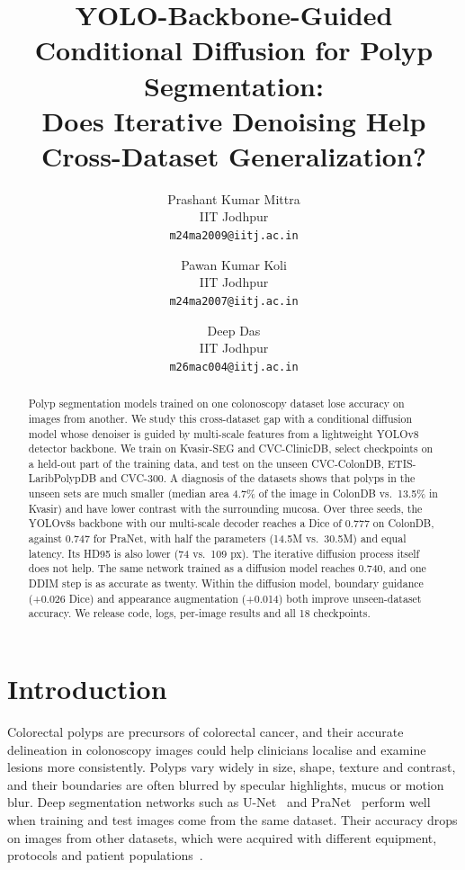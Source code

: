 \documentclass[10pt,twocolumn,letterpaper]{article}
\title{YOLO-Backbone-Guided Conditional Diffusion for Polyp Segmentation:\\
Does Iterative Denoising Help Cross-Dataset Generalization?}
\author{Prashant Kumar Mittra\\
IIT Jodhpur\\
{\tt\small m24ma2009@iitj.ac.in}
\and
Pawan Kumar Koli\\
IIT Jodhpur\\
{\tt\small m24ma2007@iitj.ac.in}
\and
Deep Das\\
IIT Jodhpur\\
{\tt\small m26mac004@iitj.ac.in}
}
\begin{document}
\maketitle

\begin{abstract}
Polyp segmentation models trained on one colonoscopy dataset lose accuracy on images from another. We study this cross-dataset gap with a conditional diffusion model whose denoiser is guided by multi-scale features from a lightweight YOLOv8 detector backbone. We train on Kvasir-SEG and CVC-ClinicDB, select checkpoints on a held-out part of the training data, and test on the unseen CVC-ColonDB, ETIS-LaribPolypDB and CVC-300. A diagnosis of the datasets shows that polyps in the unseen sets are much smaller (median area 4.7\% of the image in ColonDB vs.\ 13.5\% in Kvasir) and have lower contrast with the surrounding mucosa. Over three seeds, the YOLOv8s backbone with our multi-scale decoder reaches a Dice of 0.777 on ColonDB, against 0.747 for PraNet, with half the parameters (14.5M vs.\ 30.5M) and equal latency. Its HD95 is also lower (74 vs.\ 109 px). The iterative diffusion process itself does not help. The same network trained as a diffusion model reaches 0.740, and one DDIM step is as accurate as twenty. Within the diffusion model, boundary guidance (+0.026 Dice) and appearance augmentation (+0.014) both improve unseen-dataset accuracy. We release code, logs, per-image results and all 18 checkpoints.
\end{abstract}

\section{Introduction}
\label{sec:intro}

Colorectal polyps are precursors of colorectal cancer, and their accurate delineation in colonoscopy images could help clinicians localise and examine lesions more consistently. Polyps vary widely in size, shape, texture and contrast, and their boundaries are often blurred by specular highlights, mucus or motion blur. Deep segmentation networks such as U-Net~\cite{ronneberger2015unet} and PraNet~\cite{fan2020pranet} perform well when training and test images come from the same dataset. Their accuracy drops on images from other datasets, which were acquired with different equipment, protocols and patient populations~\cite{srivastava2022gmsrf,ali2023polypgen}.
\end{document}
